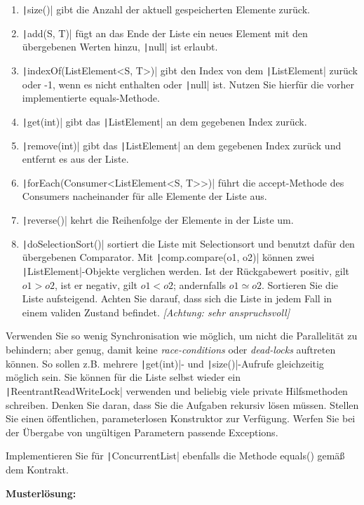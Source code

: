 \documentclass[11pt]{exam} %
\newcommand{\code}[1]{\texttt|#1|}
\begin{document}
\begin{enumerate}
\item \code{size()} gibt die Anzahl der aktuell gespeicherten Elemente zurück.
\item \code{add(S, T)} fügt an das Ende der Liste ein neues Element mit den übergebenen Werten hinzu, \code{null} ist erlaubt.
\item \code{indexOf(ListElement<S, T>)} gibt den Index von dem \code{ListElement} zurück oder -1, wenn es nicht enthalten oder \code{null} ist. Nutzen Sie hierfür die vorher implementierte equals-Methode.
\item \code{get(int)} gibt das \code{ListElement} an dem gegebenen Index zurück.
\item \code{remove(int)} gibt das \code{ListElement} an dem gegebenen Index zurück und entfernt es aus der Liste.
\item \code{forEach(Consumer<ListElement<S, T>>)} führt die accept-Methode des Consumers nacheinander für alle Elemente der Liste aus.
\item \code{reverse()} kehrt die Reihenfolge der Elemente in der Liste um.
\item \code{doSelectionSort()} sortiert die Liste mit Selectionsort und benutzt dafür den übergebenen Comparator. Mit \code{comp.compare(o1, o2)} können zwei \code{ListElement}-Objekte verglichen werden. Ist der Rückgabewert positiv, gilt $o1 > o2$, ist er negativ, gilt $o1 < o2$; andernfalls $o1 \simeq o2$. Sortieren Sie die Liste aufsteigend. Achten Sie darauf, dass sich die Liste in jedem Fall in einem validen Zustand befindet. \hspace*{\fill}\emph{[Achtung: sehr anspruchsvoll]}
\end{enumerate}
Verwenden Sie so wenig Synchronisation wie möglich, um nicht die Parallelität zu behindern; aber genug, damit keine \emph{race-conditions} oder \emph{dead-locks} auftreten können. So sollen z.B. mehrere \code{get(int)}- und \code{size()}-Aufrufe gleichzeitig möglich sein. Sie können für die Liste selbst wieder ein \code{ReentrantReadWriteLock} verwenden und beliebig viele private Hilfsmethoden schreiben. Denken Sie daran, dass Sie die Aufgaben rekursiv lösen müssen. Stellen Sie einen öffentlichen, parameterlosen Konstruktor zur Verfügung. Werfen Sie bei der Übergabe von ungültigen Parametern passende Exceptions.\par
Implementieren Sie für \code{ConcurrentList} ebenfalls die Methode equals() gemäß dem Kontrakt.

\ifprintanswers
\textbf{Musterlösung:}\par\nobreak
\inputminted[linenos,breaklines,breakindent=20pt,frame=single,tabsize=4]{Java}{../src/ConcurrentList.java}
\fi

\printbibliography
\end{document}
